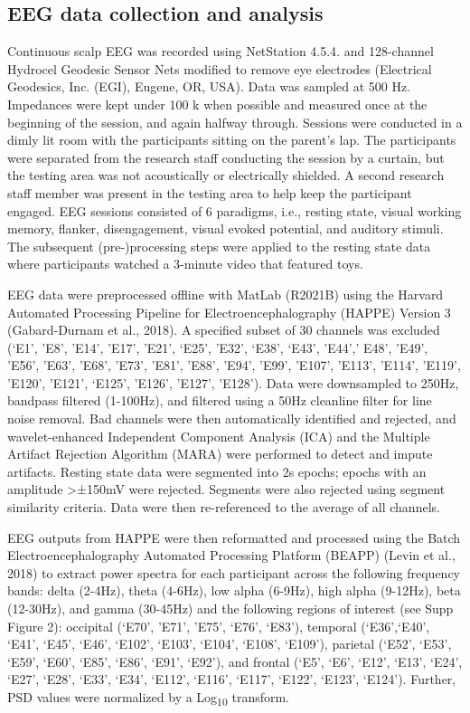 \documentclass{article}
\begin{document}
\subsection*{EEG data collection and analysis}
Continuous scalp EEG was recorded using NetStation 4.5.4. and 128-channel Hydrocel Geodesic Sensor Nets modified to remove eye electrodes (Electrical Geodesics, Inc. (EGI), Eugene, OR, USA).
Data was sampled at 500 Hz.
Impedances were kept under 100 k\textohm{} when possible and measured once at the beginning of the session, and again halfway through.
Sessions were conducted in a dimly lit room with the participants sitting on the parent’s lap.
The participants were separated from the research staff conducting the session by a curtain, but the testing area was not acoustically or electrically shielded.
A second research staff member was present in the testing area to help keep the participant engaged.
EEG sessions consisted of 6 paradigms, i.e., resting state, visual working memory, flanker, disengagement, visual evoked potential, and auditory stimuli.
The subsequent (pre-)processing steps were applied to the resting state data where participants watched a 3-minute video that featured toys.

EEG data were preprocessed offline with MatLab (R2021B) using the Harvard Automated Processing Pipeline for Electroencephalography (HAPPE) Version 3 (Gabard-Durnam et al., 2018).
A specified subset of 30 channels was excluded (‘E1’, ’E8’, ’E14’, ’E17’, ’E21’, ‘E25’, ’E32’, ‘E38’, ‘E43’, ’E44’,’ E48’, ’E49’, ’E56’, ’E63’, ’E68’, ’E73’, ’E81’, ’E88’, ’E94’, ’E99’, ’E107’, ’E113’, ’E114’, ’E119’, ’E120’, ’E121’, ‘E125', 'E126', 'E127', 'E128').
Data were downsampled to 250Hz, bandpass filtered (1-100Hz), and filtered using a 50Hz cleanline filter for line noise removal.
Bad channels were then automatically identified and rejected, and wavelet-enhanced Independent Component Analysis (ICA) and the Multiple Artifact Rejection Algorithm (MARA) were performed to detect and impute artifacts.
Resting state data were segmented into 2s epochs; epochs with an amplitude >±150mV were rejected.
Segments were also rejected using segment similarity criteria.
Data were then re-referenced to the average of all channels.

EEG outputs from HAPPE were then reformatted and processed using the Batch Electroencephalography Automated Processing Platform (BEAPP) (Levin et al., 2018) to extract power spectra for each participant across the following frequency bands: delta (2-4Hz), theta (4-6Hz), low alpha (6-9Hz), high alpha (9-12Hz), beta (12-30Hz), and gamma (30-45Hz) and the following regions of interest (see Supp Figure 2): occipital (‘E70’, ’E71’, ’E75’, ‘E76’, ‘E83’), temporal (‘E36’,‘E40’, ‘E41’, ‘E45’, ‘E46’, ‘E102’, ‘E103’, ‘E104’, ‘E108’, ‘E109’), parietal (‘E52’, ‘E53’, ‘E59’, ‘E60’, ‘E85’, ‘E86’, ‘E91’, ‘E92’), and frontal (‘E5’, ‘E6’, ‘E12’, ‘E13’, ‘E24’, ‘E27’, ‘E28’, ‘E33’, ‘E34’, ‘E112’, ‘E116’, ‘E117’, ‘E122’, ‘E123’, ‘E124’).
Further, PSD values were normalized by a Log\textsubscript{10} transform.
\end{document}
